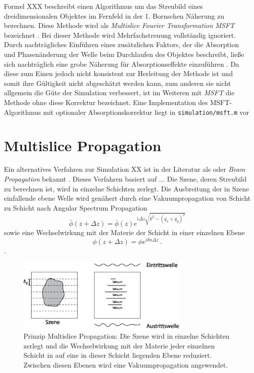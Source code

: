 	Formel XXX beschreibt einen Algorithmus um das Streubild eines dreidimensionalen Objektes im Fernfeld in der 1. Bornschen Näherung zu berechnen. Diese Methode wird als \textit{Multislice Fourier Transformation} \textit{MSFT} bezeichnet \cite{barke2015}. 
	Bei dieser Methode wird Mehrfachstreuung vollständig ignoriert. Durch nachträgliches Einführen eines zusätzlichen Faktors, der die Absorption und Phasenänderung der Welle beim Durchlaufen des Objektes beschreibt, ließe sich nachträglich eine grobe Näherung für Absorptionseffekte einzuführen \cite{barke2015}. Da diese zum Einen jedoch nicht konsistent zur Herleitung der Methode ist und somit ihre Gültigkeit nicht abgeschätzt werden kann, zum anderen sie nicht allgemein die Güte der Simulation verbessert, ist im Weiteren mit \textit{MSFT} die Methode ohne diese Korrektur bezeichnet.
	Eine Implementation des MSFT-Algorithmus mit optionaler Absorptionskorrektur liegt in \texttt{simulation/msft.m} vor 

\section{Multislice Propagation}
	Ein alternatives Verfahren zur Simulation XX ist in der Literatur als  oder \textit{Beam Propagation} bekannt \cite{hare1994,cowley1957}. Dieses Verfahren basiert auf ...
	Die Szene, deren Streubild zu berechnen ist, wird in einzelne Schichten zerlegt.
	Die Ausbreitung der in Szene einfallende ebene Welle wird genähert durch eine Vakuumpropagation von Schicht zu Schicht nach Angular Spectrum Propagation
	\begin{equation}
\bar{\phi}\left(z+\Delta z\right)=\bar{\phi}(z)e^{i\Delta z\sqrt{k^2-(q_x+q_y)^2}}
	\end{equation}
	sowie eine Wechselwirkung mit der Materie der Schicht in einer einzelnen Ebene
	\begin{equation}
		\phi(z+\Delta z)=\phi e^{i\delta n \Delta z} \, .
	\end{equation}.
	
	\begin{figure}
		\centering
		\includegraphics[width=0.75\textwidth]{images/multislice.eps}
		\caption[Prinzip Multislice Propagation]{Prinzip Multislice Propagation: Die Szene wird in einzelne Schichten zerlegt und die Wechselwirkung mit der Materie jeder einzelnen Schicht in auf eine in dieser Schicht liegenden Ebene reduziert. Zwischen diesen Ebenen wird eine Vakuumpropagation angewendet.}
		\label{fig:multislice}
	\end{figure} 
	
